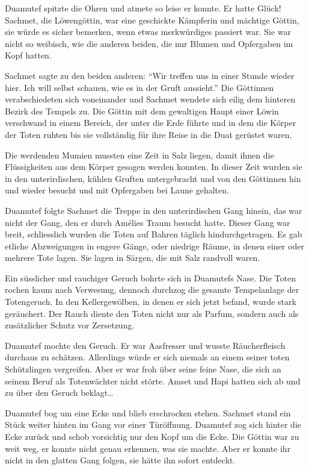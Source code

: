 \documentclass[11pt,titlepage,a5paper]{book}
\begin{document}
Duamutef spitzte die Ohren und atmete so leise er konnte. Er hatte Glück! Sachmet, die Löwengöttin, war eine geschickte Kämpferin und mächtige Göttin, sie würde es sicher bemerken, wenn etwas merkwürdiges passiert war. Sie war nicht so weibisch, wie die anderen beiden, die nur Blumen und Opfergaben im Kopf hatten.

Sachmet sagte zu den beiden anderen: "`Wir treffen uns in einer Stunde wieder hier. Ich will selbst schauen, wie es in der Gruft aussieht."' Die Göttinnen verabschiedeten sich voneinander und Sachmet wendete sich eilig dem hinteren Bezirk des Tempels zu. Die Göttin mit dem gewaltigen Haupt einer Löwin verschwand in einem Bereich, der unter die Erde führte und in dem die Körper der Toten ruhten bis sie vollständig für ihre Reise in die Duat gerüstet waren.

 Die werdenden Mumien mussten eine Zeit in Salz liegen, damit ihnen die Flüssigkeiten aus dem Körper gesogen werden konnten. In dieser Zeit wurden sie in den unterirdischen, kühlen Gruften untergebracht und von den Göttinnen hin und wieder besucht und mit Opfergaben bei Laune gehalten.
 
Duamutef folgte Sachmet die Treppe in den unterirdischen Gang hinein, das war nicht der Gang, den er durch Amélies Traum besucht hatte. Dieser Gang war breit, schliesslich wurden die Toten auf Bahren täglich hindurchgetragen. Es gab etliche Abzweigungen in engere Gänge, oder niedrige Räume, in denen einer oder mehrere Tote lagen. Sie lagen in Särgen, die mit Salz randvoll waren.

Ein süsslicher und rauchiger Geruch bohrte sich in Duamutefs Nase. Die Toten rochen kaum nach Verwesung, dennoch durchzog die gesamte Tempelanlage der Totengeruch. In den Kellergewölben, in denen er sich jetzt befand, wurde stark geräuchert. Der Rauch diente den Toten nicht nur als Parfum, sondern auch als zusätzlicher Schutz vor Zersetzung.

Duamutef mochte den Geruch. Er war Aasfresser und wusste Räucherfleisch durchaus zu schätzen. Allerdings würde er sich niemals an einem seiner toten Schützlingen vergreifen. Aber er war froh über seine feine Nase, die sich an seinem Beruf als Totenwächter nicht störte. Amset und Hapi hatten sich ab und zu über den Geruch beklagt\dots

Duamutef bog um eine Ecke und blieb erschrocken stehen. Sachmet stand ein Stück weiter hinten im Gang vor einer Türöffnung. Duamutef zog sich hinter die Ecke zurück und schob vorsichtig nur den Kopf um die Ecke. Die Göttin war zu weit weg, er konnte nicht genau erkennen, was sie machte. Aber er konnte ihr nicht in den glatten Gang folgen, sie hätte ihn sofort entdeckt.
\end{document}
